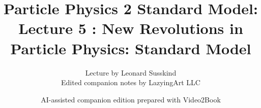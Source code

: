 \documentclass[11pt,oneside]{book}
\begin{document}
\frontmatter
\title{Particle Physics 2 Standard Model: Lecture 5 : New Revolutions in Particle Physics: Standard Model}
\author{Lecture by Leonard Susskind\\Edited companion notes by LazyingArt LLC}
\date{AI-assisted companion edition prepared with Video2Book}
\maketitle
\clearpage
\mainmatter

\end{document}
